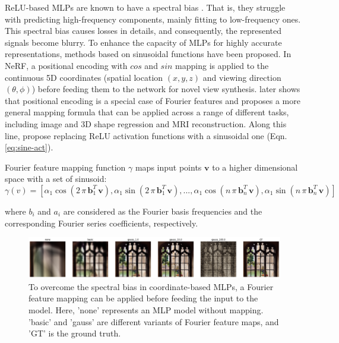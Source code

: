 ReLU-based MLPs are known to have a spectral bias \cite{rahaman2019spectral}. That is, they struggle with predicting high-frequency components, mainly fitting to low-frequency ones. This spectral bias causes losses in details, and consequently, the represented signals become blurry. To enhance the capacity of MLPs for highly accurate representations, methods based on sinusoidal functions have been proposed. In NeRF, a positional encoding with $cos$ and $sin$ mapping is applied to the continuous 5D coordinates (spatial location $(x, y, z)$ and viewing direction $(\theta, \phi)$) before feeding them to the network for novel view synthesis. \citeauthor{ffn} \cite{ffn} later shows that positional encoding is a special case of Fourier features \cite{rahimi2007random} and proposes a more general mapping formula that can be applied across a range of different tasks, including image and 3D shape regression and MRI reconstruction. Along this line, \citeauthor{sitzmann2020siren} \cite{sitzmann2020siren} propose replacing ReLU activation functions with a sinusoidal one (Eqn. \ref{eq:sine-act}).

Fourier feature mapping function $\gamma$ maps input points $\mathbf{v}$ to a higher dimensional space with a set of sinusoid:
\begin{equation}
\gamma(v) = [\alpha_1 \cos(2 \, \pi \, \mathbf{b}^T_1 \, \mathbf{v}), \alpha_1 \sin(2 \, \pi \, \mathbf{b}^T_1 \, \mathbf{v}), ..., \alpha_1 \cos(n \, \pi \, \mathbf{b}^T_n \, \mathbf{v}), \alpha_1 \sin(n \, \pi \, \mathbf{b}^T_n \, \mathbf{v})]
\label{eq:ffn}
\end{equation}

where $b_i$ and $a_i$ are considered as  the Fourier basis frequencies and the corresponding Fourier series coefficients, respectively.

\begin{figure}[ht]
  \centering
   \includegraphics[width=\linewidth]{Images/FFN.png}
   \caption{To overcome the spectral bias in coordinate-based MLPs, a Fourier feature mapping \cite{ffn} can be applied before feeding the input to the model. Here, 'none' represents an MLP model without mapping. 'basic' and 'gauss' are different variants of Fourier feature maps, and 'GT' is the ground truth.}
   \label{fig:ffn}
\end{figure}

